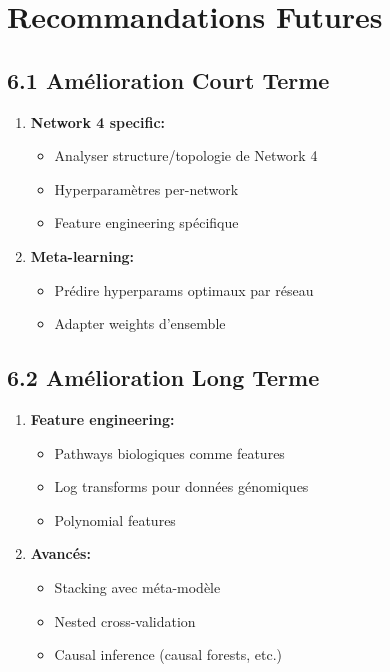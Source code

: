 \documentclass[12pt,a4paper,french]{article}
\begin{document}
\section{Recommandations Futures}

\subsection{6.1 Amélioration Court Terme}

\begin{enumerate}
    \item \textbf{Network 4 specific:}
    \begin{itemize}
        \item Analyser structure/topologie de Network 4
        \item Hyperparamètres per-network
        \item Feature engineering spécifique
    \end{itemize}
    
    \item \textbf{Meta-learning:}
    \begin{itemize}
        \item Prédire hyperparams optimaux par réseau
        \item Adapter weights d'ensemble
    \end{itemize}
\end{enumerate}

\subsection{6.2 Amélioration Long Terme}

\begin{enumerate}
    \item \textbf{Feature engineering:}
    \begin{itemize}
        \item Pathways biologiques comme features
        \item Log transforms pour données génomiques
        \item Polynomial features
    \end{itemize}
    
    \item \textbf{Avancés:}
    \begin{itemize}
        \item Stacking avec méta-modèle
        \item Nested cross-validation
        \item Causal inference (causal forests, etc.)
    \end{itemize}
\end{enumerate}
\end{document}
